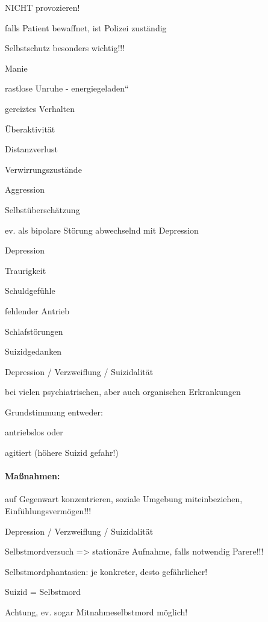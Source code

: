 {\mdseries
NICHT provozieren!}

{\mdseries
falls Patient bewaffnet, ist Polizei zuständig}

{\mdseries
Selbstschutz besonders wichtig!!!}

{\mdseries
Manie}

{\mdseries
rastlose Unruhe - {\quotedblbase}energiegeladen{\textquotedblleft}}

{\mdseries
gereiztes Verhalten}

{\mdseries
\"Uberaktivität}

{\mdseries
Distanzverlust}

{\mdseries
Verwirrungszustände}

{\mdseries
Aggression}

{\mdseries
Selbst\"uberschätzung}

{\mdseries
ev. als bipolare Störung abwechselnd mit  Depression}

{\mdseries
Depression}

{\mdseries
Traurigkeit}

{\mdseries
Schuldgef\"uhle}

{\mdseries
fehlender Antrieb}

{\mdseries
Schlafstörungen}

{\mdseries
Suizidgedanken}

{\mdseries
Depression / Verzweiflung / Suizidalität}

{\mdseries
bei vielen psychiatrischen, aber auch  organischen Erkrankungen}

{\mdseries
Grundstimmung entweder:}

{\mdseries
antriebslos  oder}

{\mdseries
agitiert (höhere Suizid gefahr!)}

\paragraph{Ma{\ss}nahmen:}

{\mdseries
auf Gegenwart konzentrieren, soziale  Umgebung miteinbeziehen, 
Einf\"uhlungsvermögen!!!}

{\mdseries
Depression / Verzweiflung / Suizidalität}

{\mdseries
Selbstmordversuch ={\textgreater} stationäre  Aufnahme, falls
notwendig Parere!!!}

{\mdseries
Selbstmordphantasien: je konkreter,  desto gefährlicher!}

{\mdseries
Suizid = Selbstmord}

{\mdseries
Achtung, ev. sogar Mitnahmeselbstmord  möglich!}

